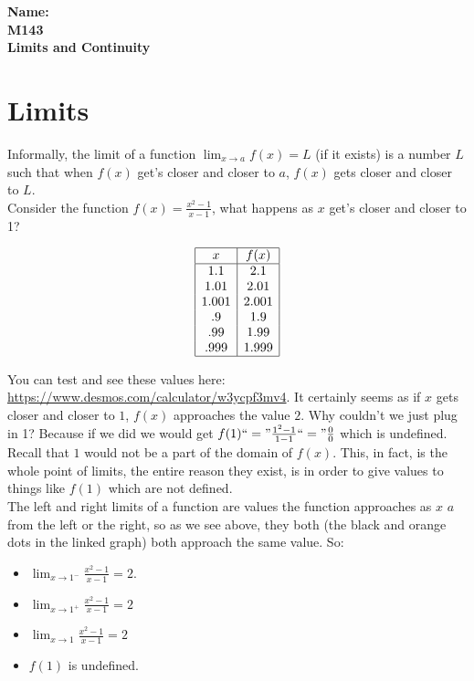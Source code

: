 \documentclass[10pt]{article}
\theoremstyle{definition}
\newcommand{\limit}[2]{\displaystyle{ \lim_{#1 \to #2}}}
\begin{document}
%

{\bf Name:} \hrulefill\hrulefill\hrulefill\\
{\bf M143} \qquad \qquad \\
{\bf Limits and Continuity}\\ %

\section{Limits}

Informally, the limit of a function $\limit{x}{a} f(x)=L$ (if it exists) is a number $L$ such that when $f(x)$ get's closer and closer to $a$, $f(x)$ gets closer and closer to $L$. \\

Consider the function $f(x)=\frac{x^2-1}{x-1}$, what happens as $x$ get's closer and closer to 1?

$$
\begin{array}{|c|c|}
\hline
x & f(x)\\
\hline
1.1 & 2.1\\
1.01 & 2.01\\
1.001 & 2.001\\
.9 & 1.9\\
.99&1.99\\
.999 & 1.999\\
\hline
\end{array}$$

You can test and see these values here: \url{https://www.desmos.com/calculator/w3ycpf3mv4}.  It certainly seems as if $x$ gets closer and closer to $1$, $f(x)$ approaches the value $2$.  Why couldn't we just plug in 1?  Because if we did we would get $f(1)``="\frac{1^2-1}{1-1}``="\frac{0}{0}$ which is undefined.  Recall that $1$ would not be a part of the domain of $f(x)$.  This, in fact, is the whole point of limits, the entire reason they exist, is in order to give values to things like $f(1)$ which are not defined.\\

The left and right limits of a function are values the function approaches as $x$ $a$ from the left or the right, so as we see above, they both (the black and orange dots in the linked graph) both approach the same value.  So:

\begin{itemize}
\item $\limit{x}{1^-}\frac{x^2-1}{x-1}=2$.
\item $\limit{x}{1^+}\frac{x^2-1}{x-1}=2$
\item $\limit{x}{1}\frac{x^2-1}{x-1}=2$
\item $f(1)$ is undefined.
\end{itemize}
\end{document}

